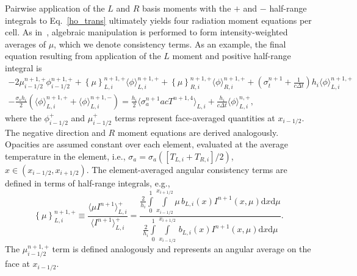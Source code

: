 \documentclass{mc2013}
\renewcommand{\d}{\mathrm{d}}
\newcommand{\mom}[1]{\langle #1 \rangle}
\newcommand{\cur}[1]{\left\{ #1 \right\}}
\newcommand{\xl}{{x_{i-1/2}}}
\newcommand{\xr}{{x_{i+1/2}}}
\newcommand{\il}{{i-1/2}}
\newcommand{\ir}{{i+1/2}}
\begin{document}
Pairwise application of the $L$ and $R$ basis
moments with the $+$ and $-$ half-range integrals to Eq.~\eqref{ho_trans} 
ultimately yields four radiation moment
equations per cell. As in~\cite{wolters}, algebraic manipulation is performed to form
intensity-weighted
averages of $\mu$, which we denote consistency terms.  As an example, the final equation resulting from application of the $L$ moment and
positive half-range integral is
\begin{multline}\label{lo_tran}
    -2{\mu}_{i-1/2}^{n+1,+} \phi_{i-1/2}^{n+1,+} + \cur {\mu}_{L,i}^{n+1,+}
  \mom{\phi}_{L,i}^{n+1,+}
  +  \cur\mu_{R,i}^{n+1,+}
  \mom{\phi}_{R,i}^{n+1,+} +  \left(\sigma_t^{n+1}+\frac{1}{c \Delta t} \right) h_i 
  \mom{\phi}_{L,i}^{n+1,+} \\-  \frac{\sigma_s h_i}{2} \left( \mom{\phi}_{L,i}^{n+1,+} +
  \mom\phi_{L,i}^{n+1,-}\right) = \frac{h_i}{2} \mom{\sigma_a^{n+1} a c T^{n+1,4}}_{L,i} +
  \frac{h_i}{c\Delta t}\mom{\phi}_{L,i}^{n,+},
\end{multline}
where the $\phi^+_{i-1/2}$ and $\mu^+_{i-1/2}$ terms represent face-averaged quantities at $x_{\il}$.  The negative direction and $R$ moment equations are
derived analogously. Opacities are assumed constant over each element, evaluated at the
average temperature in the element, i.e., $\sigma_a = \sigma_a([T_{L,i}+T_{R,i}]/2)$,
$x\in(x_\il, x_\ir)$. The element-averaged angular consistency terms are defined in terms of half-range integrals, e.g.,
\begin{equation}\label{const}
    \cur{{\mu}}_{L,i}^{n+1,+} \equiv \frac{\mom{\mu I^{n+1}}_{L,i}^+}{\mom{I^{n+1}}_{L,i}^+} =  \frac{
{\displaystyle \frac{2}{h_i}} \int\limits_0^1 \int\limits_\xl^\xr \mu \, b_{L,i}(x)
I^{n+1}(x,\mu) \d x \d \mu } 
{{\displaystyle \frac{2}{h_i}} \int\limits_0^1 \int\limits_\xl^\xr \, b_{L,i}(x)
I^{n+1}(x,\mu) \d x \d \mu } .
\end{equation}
The $\mu_{i-1/2}^{n+1,+}$ term is defined analogously and represents an angular average on the face at $x_{\il}$.

\end{document}
